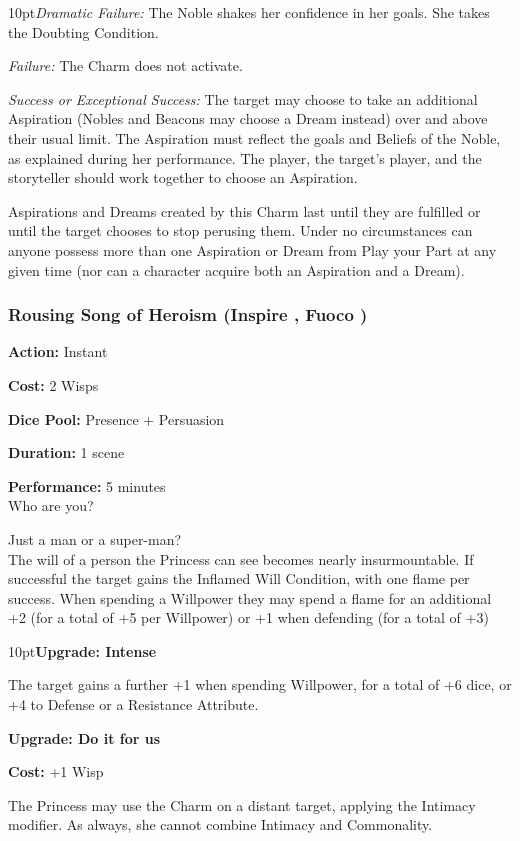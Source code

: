    \begin{myindentpar}{10pt}\emph{Dramatic Failure:} The Noble shakes her confidence in her goals. She takes the Doubting Condition.

    \emph{Failure:} The Charm does not activate.

    \emph{Success or Exceptional Success:} The target may choose to take an additional Aspiration (Nobles and Beacons may choose a Dream instead) over and above their usual limit.  The Aspiration must reflect the goals and Beliefs of the Noble, as explained during her performance. The player, the target's player, and the storyteller should work together to choose an Aspiration. 
    
    Aspirations and Dreams created by this Charm last until they are fulfilled or until the target chooses to stop perusing them. Under no circumstances can anyone possess more than one Aspiration or Dream from Play your Part at any given time (nor can a character acquire both an Aspiration and a Dream).   

	\end{myindentpar}
	
\subsubsection*{Rousing Song of Heroism (Inspire \textbullet\textbullet\textbullet, Fuoco \textbullet\textbullet)}

\noindent \textbf{Action:} Instant

\noindent \textbf{Cost:} 2 Wisps

\noindent \textbf{Dice Pool:} Presence + Persuasion

\noindent \textbf{Duration:} 1 scene 

\noindent \textbf{Performance:} 5 minutes \\

\noindent Who are you? 

\noindent Just a man or a super-man?\\

The will of a person the Princess can see becomes nearly insurmountable. If successful the target gains the Inflamed Will Condition, with one flame per success. When spending a Willpower they may spend a flame for an additional +2 (for a total of +5 per Willpower) or +1 when defending (for a total of +3)

\begin{myindentpar}{10pt}\textbf{Upgrade: Intense}

The target gains a further +1 when spending Willpower, for a total of +6 dice, or +4 to Defense or a Resistance Attribute.

\textbf{Upgrade: Do it for us}

\noindent \textbf{Cost:} +1 Wisp

The Princess may use the Charm on a distant target, applying the Intimacy modifier. As always, she cannot combine Intimacy and Commonality.\end{myindentpar}

